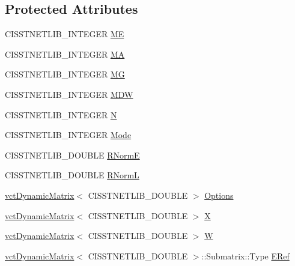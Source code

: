 \subsection*{Protected Attributes}
\begin{DoxyCompactItemize}
\item 
C\+I\+S\+S\+T\+N\+E\+T\+L\+I\+B\+\_\+\+I\+N\+T\+E\+G\+E\+R \hyperlink{classnmr_l_s_e_i_solver_a226c819beb87b1756570a1739f81ad16}{M\+E}
\item 
C\+I\+S\+S\+T\+N\+E\+T\+L\+I\+B\+\_\+\+I\+N\+T\+E\+G\+E\+R \hyperlink{classnmr_l_s_e_i_solver_a1cb20a6323aad18c24b11714180e21a6}{M\+A}
\item 
C\+I\+S\+S\+T\+N\+E\+T\+L\+I\+B\+\_\+\+I\+N\+T\+E\+G\+E\+R \hyperlink{classnmr_l_s_e_i_solver_ab3c2d56d8f5228ed1d724b333da52c0a}{M\+G}
\item 
C\+I\+S\+S\+T\+N\+E\+T\+L\+I\+B\+\_\+\+I\+N\+T\+E\+G\+E\+R \hyperlink{classnmr_l_s_e_i_solver_ab59ba7cd14b159254680495fb71955ee}{M\+D\+W}
\item 
C\+I\+S\+S\+T\+N\+E\+T\+L\+I\+B\+\_\+\+I\+N\+T\+E\+G\+E\+R \hyperlink{classnmr_l_s_e_i_solver_a7f1583416d76d07acaf011a855aa8e50}{N}
\item 
C\+I\+S\+S\+T\+N\+E\+T\+L\+I\+B\+\_\+\+I\+N\+T\+E\+G\+E\+R \hyperlink{classnmr_l_s_e_i_solver_a28cfc74149771e09948f019db3aee14f}{Mode}
\item 
C\+I\+S\+S\+T\+N\+E\+T\+L\+I\+B\+\_\+\+D\+O\+U\+B\+L\+E \hyperlink{classnmr_l_s_e_i_solver_a94ec18f12a4352c356ed0c802f2f0ced}{R\+Norm\+E}
\item 
C\+I\+S\+S\+T\+N\+E\+T\+L\+I\+B\+\_\+\+D\+O\+U\+B\+L\+E \hyperlink{classnmr_l_s_e_i_solver_aebb79a24226336ee09db4a7650ccfb75}{R\+Norm\+L}
\item 
\hyperlink{classvct_dynamic_matrix}{vct\+Dynamic\+Matrix}$<$ C\+I\+S\+S\+T\+N\+E\+T\+L\+I\+B\+\_\+\+D\+O\+U\+B\+L\+E $>$ \hyperlink{classnmr_l_s_e_i_solver_a543ee26ff54d6013059361219790c54b}{Options}
\item 
\hyperlink{classvct_dynamic_matrix}{vct\+Dynamic\+Matrix}$<$ C\+I\+S\+S\+T\+N\+E\+T\+L\+I\+B\+\_\+\+D\+O\+U\+B\+L\+E $>$ \hyperlink{classnmr_l_s_e_i_solver_ab5f8afa5ce2709553fb43e161f05273d}{X}
\item 
\hyperlink{classvct_dynamic_matrix}{vct\+Dynamic\+Matrix}$<$ C\+I\+S\+S\+T\+N\+E\+T\+L\+I\+B\+\_\+\+D\+O\+U\+B\+L\+E $>$ \hyperlink{classnmr_l_s_e_i_solver_ab4e958a8679e59284ab62db215533c67}{W}
\item 
\hyperlink{classvct_dynamic_matrix}{vct\+Dynamic\+Matrix}$<$ C\+I\+S\+S\+T\+N\+E\+T\+L\+I\+B\+\_\+\+D\+O\+U\+B\+L\+E $>$\+::Submatrix\+::\+Type \hyperlink{classnmr_l_s_e_i_solver_a13a0319be7a8773f42b2d6b26b33001e}{E\+Ref}

\end{DoxyCompactItemize}
